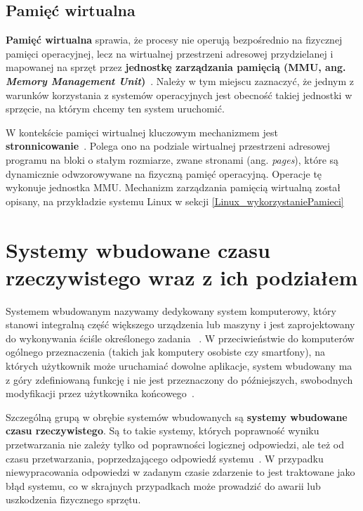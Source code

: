 \subsection{Pamięć wirtualna}
\textbf{Pamięć wirtualna} sprawia, że procesy nie operują bezpośrednio na fizycznej pamięci operacyjnej, lecz na wirtualnej przestrzeni adresowej przydzielanej i mapowanej na sprzęt przez \textbf{jednostkę zarządzania pamięcią (MMU, ang. \textit{Memory Management Unit})}~\cite{Tanenbaum}. Należy w tym miejscu zaznaczyć, że jednym z warunków korzystania z systemów operacyjnych
jest obecność takiej jednostki w sprzęcie, na którym chcemy ten system uruchomić.

W kontekście pamięci wirtualnej kluczowym mechanizmem jest \textbf{stronnicowanie}~\cite{Tanenbaum}. Polega ono na podziale wirtualnej przestrzeni adresowej programu na bloki o stałym rozmiarze, zwane stronami (ang. \textit{pages}), które są dynamicznie odwzorowywane na fizyczną pamięć operacyjną. Operacje tę wykonuje jednostka MMU.
Mechanizm zarządzania pamięcią wirtualną został opisany, na przykładzie systemu Linux w sekcji \ref{Linux_wykorzystaniePamieci}


\section{Systemy wbudowane czasu rzeczywistego wraz z ich podziałem}
Systemem wbudowanym nazywamy dedykowany system komputerowy, który stanowi integralną część większego urządzenia lub maszyny i jest zaprojektowany do wykonywania 
ściśle określonego zadania ~\cite{Tanenbaum}. W przeciwieństwie do komputerów ogólnego przeznaczenia (takich jak komputery osobiste czy smartfony), 
na których użytkownik może uruchamiać dowolne aplikacje, system wbudowany ma z góry zdefiniowaną funkcję i nie jest przeznaczony do późniejszych, swobodnych modyfikacji przez użytkownika końcowego~\cite{Abraham_Silberschatz}.

Szczególną grupą w obrębie systemów wbudowanych są \textbf{systemy wbudowane czasu rzeczywistego}. Są to takie systemy, których poprawność wyniku przetwarzania nie zależy tylko od poprawności logicznej odpowiedzi, ale też od czasu przetwarzania, poprzedzającego odpowiedź systemu~\cite{WangK}.
W przypadku niewypracowania odpowiedzi w zadanym czasie zdarzenie to jest traktowane jako błąd systemu, co w skrajnych przypadkach może prowadzić do awarii lub uszkodzenia fizycznego sprzętu. 

